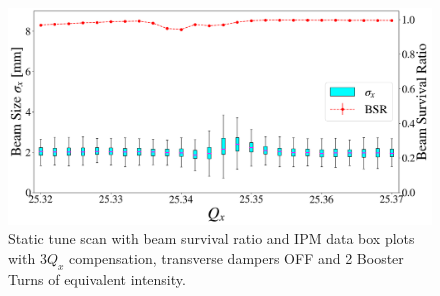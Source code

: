 \begin{figure}[H]
    \centering
    \includegraphics[width=\columnwidth]{chapter6/static2turns_ipm_dampersOFF.png}
    \caption{Static tune scan with beam survival ratio and IPM data box plots with $3Q_x$ compensation, transverse dampers OFF and 2 Booster Turns of equivalent intensity.}
    \label{fig:static2_dampersOFF}
\end{figure}

